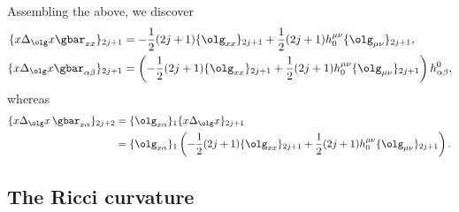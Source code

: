 Assembling the above, we discover
\begin{align} \label{eqn:laplacian-asymp-xx}
\{ x \Delta_{\olg} x \gbar_{xx} \}_{2j+1} &= -\frac{1}{2} (2j+1) \{\olg_{xx}\}_{2j+1} +\frac{1}{2} (2j+1) h_0^{\mu\nu}\{\olg_{\mu\nu}\}_{2j+1}, \\
\{ x \Delta_{\olg} x \gbar_{\alpha \beta} \}_{2j+1} &= \left(-\frac{1}{2} (2j+1) \{\olg_{xx}\}_{2j+1} +\frac{1}{2} (2j+1) h_0^{\mu \nu}\{\olg_{\mu\nu}\}_{2j+1} \right)h^0_{\alpha \beta},\label{eqn:laplacian-asymp-ab}
\end{align}
whereas
\begin{align}
\{ x \Delta_{\olg} x \, \gbar_{x \alpha} \}_{2j+2} &= \{ \olg_{x \alpha}\}_1 \{ x \Delta_{\olg} x\}_{2j+1} \nonumber\\
&= \{ \olg_{x \alpha}\}_1 \left( -\frac{1}{2} (2j+1) \{\olg_{xx}\}_{2j+1} +\frac{1}{2} (2j+1) h_0^{\mu \nu}\{\olg_{\mu \nu}\}_{2j+1}\right). \label{eqn:mixed-ref-2}
\end{align}

\subsection*{The Ricci curvature}

